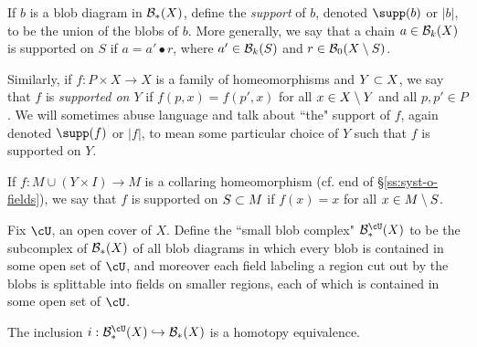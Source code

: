 \medskip

If $b$ is a blob diagram in ${\mathcal B}_*(X)$, define the {\it support} of $b$, denoted
$\supp(b)$ or $|b|$, to be the union of the blobs of $b$.
More generally, we say that a chain $a\in {\mathcal B}_k(X)$ is supported on $S$ if
$a = a'\bullet r$, where $a'\in {\mathcal B}_k(S)$ and $r\in {\mathcal B}_0(X\setminus S)$.

Similarly, if $f: P\times X\to X$ is a family of homeomorphisms and $Y\subset X$, we say that $f$ is 
{\it supported on $Y$} if $f(p, x) = f(p', x)$ for all $x\in X\setminus Y$ and all $p,p'\in P$.
We will sometimes abuse language and talk about ``the" support of $f$,
again denoted $\supp(f)$ or $|f|$, to mean some particular choice of $Y$ such that
$f$ is supported on $Y$.

If $f: M \cup (Y\times I) \to M$ is a collaring homeomorphism
(cf. end of \S \ref{ss:syst-o-fields}),
we say that $f$ is supported on $S\subset M$ if $f(x) = x$ for all $x\in M\setminus S$.

\medskip

Fix $\cU$, an open cover of $X$.
Define the ``small blob complex" $\bc^{\cU}_*(X)$ to be the subcomplex of ${\mathcal B}_*(X)$ 
of all blob diagrams in which every blob is contained in some open set of $\cU$, 
and moreover each field labeling a region cut out by the blobs is splittable 
into fields on smaller regions, each of which is contained in some open set of $\cU$.

\begin{lemma} \label{small-blobs-b}  \label{thm:small-blobs}
The inclusion $i: \bc^{\cU}_*(X) \into \bc_*(X)$ is a homotopy equivalence.
\end{lemma}

